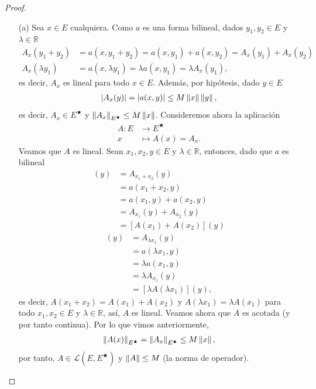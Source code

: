 \begin{proof}
    \begin{enumerate}
        \item[(a)] Sea $x \in E$ cualquiera. Como $a$ es una forma bilineal, dados $y_1,y_2\in E$ y $\lambda\in \mathbb{R}$
        \begin{align*}
            A_x(y_1+y_2)&=a(x,y_1+y_2)=a(x,y_1)+a(x,y_2)=A_x(y_1)+A_x(y_2)\\
            A_x(\lambda y_1)&=a(x,\lambda y_1)=\lambda a(x,y_1)=\lambda A_x(y_1),
        \end{align*}
        es decir, $A_x$ es lineal para todo $x \in E$. Además, por hipótesis, dado $y \in E$
        \begin{align*}
            |A_x(y)|=|a(x,y)|\leq M\left\|x\right\|\left\|y\right\|,
        \end{align*}
        es decir, $A_x\in E^\bigstar$ y $\left\|A_x\right\|_{E^\bigstar}\leq M\left\|x\right\|$. Consideremos ahora la aplicación
        \begin{align*}
            A:E &\longrightarrow E^\bigstar\\
             x &\longmapsto A(x)=A_x.
        \end{align*}
        Veamos que $A$ es lineal. Sean $x_1,x_2,y \in E$ y $\lambda\in \mathbb{R}$, entonces, dado que $a$ es bilineal
        \begin{align*}
            [A(x_1+x_2)](y)&=A_{x_1+x_2}(y)\\
            &=a(x_1+x_2,y)\\
            &=a(x_1,y)+a(x_2,y)\\
            &=A_{x_1}(y)+A_{x_2}(y)\\
            &=[A(x_1)+A(x_2)](y)
        \end{align*}
        \begin{align*}
            [A(\lambda x_1)](y)&=A_{\lambda x_1}(y)\\
            &=a(\lambda x_1,y)\\
            &=\lambda a(x_1,y)\\
            &=\lambda A_{x_1}(y)\\
            &=[\lambda A(\lambda x_1)](y),
        \end{align*}
        es decir, $A(x_1+x_2)=A(x_1)+A(x_2)$ y $A(\lambda x_1)=\lambda A(x_1)$ para todo $x_1,x_2 \in E$ y $\lambda \in \mathbb{R}$, así, $A$ es lineal. Veamos ahora que $A$ es acotada (y por tanto continua). Por lo que vimos anteriormente,
        \begin{align*}
            \left\|A(x)\right\|_{E^{\bigstar}}=\left\|A_x\right\|_{E^{\bigstar}}\leq M\left\|x\right\|,
        \end{align*}
        por tanto, $A\in \mathcal{L}(E,E^\bigstar)$ y $\left\|A\right\|\leq M$ (la norma de operador).


\end{enumerate}
\end{proof}

